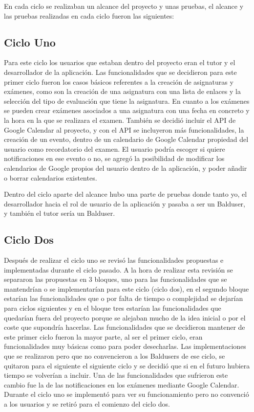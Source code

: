 En cada ciclo se realizaban un alcance del proyecto y unas pruebas, el alcance y las pruebas realizadas en cada ciclo fueron las siguientes:

\subsection{Ciclo Uno}
\label{subsecc:ciclo Uno}

Para este ciclo los usuarios que estaban dentro del proyecto eran el tutor y el desarrollador de la aplicación. Las funcionalidades que se decidieron para este primer ciclo fueron los casos básicos referentes a la creación de asignaturas y exámenes, como son la creación de una asignatura con una lista de enlaces y la selección del tipo de evaluación que tiene la asignatura. En cuanto a los exámenes se pueden crear exámenes asociados a una asignatura con una fecha en concreto y la hora en la que se realizara el examen.
También se decidió incluir el API de Google Calendar al proyecto, y con el API se incluyeron más funcionalidades, la creación de un evento, dentro de un calendario de Google Calendar propiedad del usuario como recordatorio del examen. El usuario podría escoger si quiere notificaciones en ese evento o no, se agregó la  posibilidad de modificar los calendarios de Google propios del usuario dentro de la aplicación, y poder añadir o borrar calendarios existentes.
 
Dentro del ciclo aparte del alcance hubo una parte de pruebas donde tanto yo, el desarrollador hacia el rol de usuario de la aplicación y pasaba a ser un Balduser, y también el tutor sería un Balduser.


\subsection{Ciclo Dos}
\label{subsecc:ciclo Dos}

Después de realizar el ciclo uno se revisó las funcionalidades propuestas e implementadas durante el ciclo pasado. A la hora de realizar esta revisión se separaron las propuestas en 3 bloques, uno para las funcionalidades que se mantendrían o se implementarían para este ciclo (ciclo dos), en el segundo bloque estarían las funcionalidades que o por falta de tiempo o complejidad se dejarían para ciclos siguientes y en el bloque tres estarían las funcionalidades que quedarían fuera del proyecto porque se alejaban mucho de la idea inicial o por el coste que supondría hacerlas.
Las funcionalidades que se decidieron mantener de este primer ciclo fueron la mayor parte, al ser el primer ciclo, eran funcionalidades muy básicas como para poder desecharlas. Las implementaciones que se realizaron pero que no convencieron a los Baldusers de ese ciclo, se quitaron para el siguiente el siguiente ciclo y se decidió que si en el futuro hubiera tiempo se volverían a incluir. Una de las funcionalidades que sufrieron este cambio fue la de las notificaciones en los exámenes mediante Google Calendar. Durante el ciclo uno se implementó para ver su funcionamiento pero no convenció a los usuarios y se retiró para el comienzo del ciclo dos.

